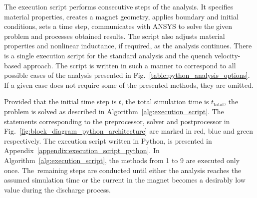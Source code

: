 
The execution script performs consecutive steps of the analysis. It specifies material properties, creates a magnet geometry, applies boundary and initial conditions, sets a time step, communicates with ANSYS to solve the given problem and processes obtained results. The script also adjusts material properties and nonlinear inductance, if required, as the analysis continues. There is a single execution script for the standard analysis and the quench velocity-based approach. The script is written in such a manner to correspond to all possible cases of the analysis presented in Fig.~\ref{table:python_analysis_options}. If a given case does not require some of the presented methods, they are omitted. 

Provided that the initial time step is $t$, the total simulation time is $t_\text{total}$, the problem is solved as described in Algorithm~\ref{alg:execution_script}. The statements corresponding to the preprocessor, solver and postprocessor in Fig.~\ref{fig:block_diagram_python_architecture} are marked in red, blue and green respectively. The execution script written in Python, is presented in Appendix~\ref{appendix:execution_script_python}. In Algorithm~\ref{alg:execution_script}, the methods from 1 to 9 are executed only once. The~remaining steps are conducted until either the analysis reaches the assumed simulation time or the current in the magnet becomes a desirably low value during the discharge process. 

